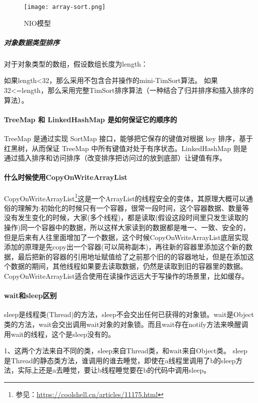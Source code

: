 \documentclass[../../../interview-questions.tex]{subfiles}
\begin{document}
\begin{figure}[htbp]
	\centering
	\texttt{[image: array-sort.png]}
	\caption{NIO模型}
	\label{fig:arraysort}
\end{figure}

\subparagraph{对象数据类型排序}


对于对象类型的数组，假设数组长度为length：

如果length<32，那么采用不包含合并操作的mini-TimSort算法。
如果32<=length，那么采用完整TimSort排序算法（一种结合了归并排序和插入排序的算法）。

\paragraph{TreeMap 和 LinkedHashMap 是如何保证它的顺序的}

TreeMap 是通过实现 SortMap 接口，能够把它保存的键值对根据 key 排序，基于红黑树，从而保证 TreeMap 中所有键值对处于有序状态。LinkedHashMap 则是通过插入排序和访问排序（改变排序把访问过的放到底部）让键值有序。

\paragraph{什么时候使用CopyOnWriteArrayList}

CopyOnWriteArrayList\footnote{参见：\url{https://coolshell.cn/articles/11175.html}}这是一个ArrayList的线程安全的变体，其原理大概可以通俗的理解为:初始化的时候只有一个容器，很常一段时间，这个容器数据、数量等没有发生变化的时候，大家(多个线程)，都是读取(假设这段时间里只发生读取的操作)同一个容器中的数据，所以这样大家读到的数据都是唯一、一致、安全的，但是后来有人往里面增加了一个数据，这个时候CopyOnWriteArrayList底层实现添加的原理是先copy出一个容器(可以简称副本)，再往新的容器里添加这个新的数据，最后把新的容器的引用地址赋值给了之前那个旧的的容器地址，但是在添加这个数据的期间，其他线程如果要去读取数据，仍然是读取到旧的容器里的数据。CopyOnWriteArrayList适合使用在读操作远远大于写操作的场景里，比如缓存。

\paragraph{wait和sleep区别}

sleep是线程类(Thread)的方法，sleep不会交出任何已获得的对象锁。wait是Object类的方法，wait会交出调用wait对象的对象锁。而且wait存在notify方法来唤醒调用wait的线程，这个是sleep没有的。

1、这两个方法来自不同的类，sleep来自Thread类，和wait来自Object类。
sleep是Thread的静态类方法，谁调用的谁去睡觉，即使在a线程里调用了b的sleep方法，实际上还是a去睡觉，要让b线程睡觉要在b的代码中调用sleep。
\end{document}

